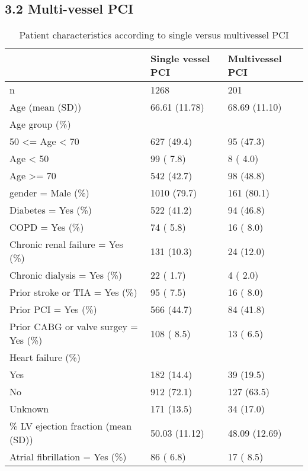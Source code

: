 \documentclass[
]{article}
\begin{document}
\hypertarget{multi-vessel-pci}{%
\subsection{3.2 Multi-vessel PCI}\label{multi-vessel-pci}}

\begin{longtable}[t]{lll}
\caption{\label{tab:table 33}Patient characteristics according to single versus multivessel PCI}\\
\toprule
 & Single vessel PCI & Multivessel PCI\\
\midrule
n & 1268 & 201\\
Age (mean (SD)) & 66.61 (11.78) & 68.69 (11.10)\\
Age group (\%) &  & \\
\hspace{1em}50 <= Age < 70 & 627 (49.4) & 95 (47.3)\\
\hspace{1em}Age < 50 & 99 ( 7.8) & 8 ( 4.0)\\
\addlinespace
\hspace{1em}Age >= 70 & 542 (42.7) & 98 (48.8)\\
gender = Male (\%) & 1010 (79.7) & 161 (80.1)\\
Diabetes = Yes (\%) & 522 (41.2) & 94 (46.8)\\
COPD = Yes (\%) & 74 ( 5.8) & 16 ( 8.0)\\
Chronic renal failure = Yes (\%) & 131 (10.3) & 24 (12.0)\\
\addlinespace
Chronic dialysis = Yes (\%) & 22 ( 1.7) & 4 ( 2.0)\\
Prior stroke or TIA = Yes (\%) & 95 ( 7.5) & 16 ( 8.0)\\
Prior PCI = Yes (\%) & 566 (44.7) & 84 (41.8)\\
Prior CABG or valve surgey = Yes (\%) & 108 ( 8.5) & 13 ( 6.5)\\
Heart failure (\%) &  & \\
\addlinespace
\hspace{1em}Yes & 182 (14.4) & 39 (19.5)\\
\hspace{1em}No & 912 (72.1) & 127 (63.5)\\
\hspace{1em}Unknown & 171 (13.5) & 34 (17.0)\\
\% LV ejection fraction (mean (SD)) & 50.03 (11.12) & 48.09 (12.69)\\
Atrial fibrillation = Yes (\%) & 86 ( 6.8) & 17 ( 8.5)\\
\bottomrule
\end{longtable}
\clearpage
\end{document}
